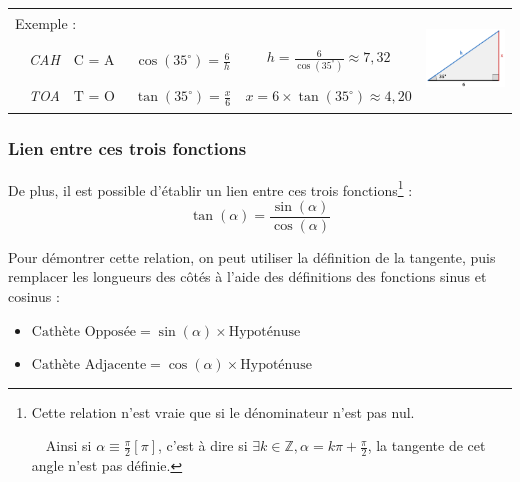 \documentclass[a4paper]{article}
\begin{document}
			\begin{center}
				\renewcommand{\arraystretch}{1.75}
				\begin{tabular}{lc|c|c|cc}
					\multicolumn{5}{l}{Exemple :} & \multirow{3}{*}{\includegraphics[height=2.5cm]{Image/Triangle/Triangle_sinus_cosinus.png}} \\
					
					\phantom{Exemp} & \textit{CAH} & $\text{C = A / H}$ & $\cos(35^\circ) = \frac{6}{h}$ & $h = \frac{6}{\cos(35^\circ)} \approx 7,32 $ & \\
										& \textit{TOA} & $\text{T = O / A}$ & $\tan(35^\circ) = \frac{x}{6}$ & $x = 6 \times \tan(35^\circ) \approx 4,20 $ &\\
				\end{tabular}
			\end{center}
			

			\vfill



		\subsubsection{Lien entre ces trois fonctions} \label{lien_fct_trigo}

			De plus,
			il est possible d'établir un lien entre ces trois fonctions\footnote{Cette relation n'est vraie que si le dénominateur n'est pas nul. 
			
			~~Ainsi si $\alpha \equiv \frac{\pi}{2} [\pi] $, c'est à dire si $\exists k \in \mathbb{Z},\alpha = k\pi + \frac{\pi}{2}$, la tangente de cet angle n'est pas définie.} :
			{ \Large $$ \tan(\alpha) = \frac{\sin(\alpha)}{\cos(\alpha)} $$}

			\medbreak
			\medbreak

			Pour démontrer cette relation, 
			on peut utiliser la définition de la tangente, 
			puis remplacer les longueurs des côtés à l'aide 
			des définitions des fonctions sinus et cosinus :

			\medbreak

			\begin{itemize}
				\item [ ] $\text{Cathète Opposée}   = \sin(\alpha) \times \text{Hypoténuse}$
				\item [ ] $\text{Cathète Adjacente} = \cos(\alpha) \times \text{Hypoténuse}$
			\end{itemize}
\end{document}
